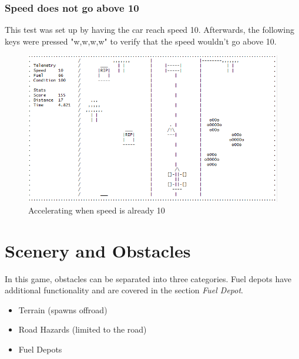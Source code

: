 \documentclass{article}
\begin{document}
\subsubsection*{Speed does not go above 10}
This test was set up by having the car reach speed 10. Afterwards, the following keys were pressed "w,w,w,w" to verify that the speed wouldn't go above 10. 
\begin{figure}[!ht]
	\begin{center}
	\includegraphics[width=0.667\paperwidth]{images/speed_test_maxacel10}
	\caption{Accelerating when speed is already 10}
	\label{fig:speed_test_acel10} 
	\end{center}
\end{figure}

\clearpage

\section{Scenery and Obstacles}
In this game, obstacles can be separated into three categories.  Fuel depots have additional functionality and are covered in the section \emph{Fuel Depot}. 
\begin{itemize}
 	\item Terrain (spawns offroad)
 	\item Road Hazards (limited to the road)
	\item Fuel Depots
\end{itemize}
\end{document}
